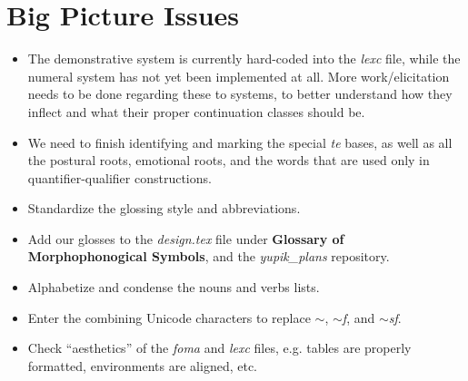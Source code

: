 \documentclass{article}
\begin{document}

\section{Big Picture Issues}

\begin{itemize}
\renewcommand\labelitemi{$\cdot$}

\item The demonstrative system is currently hard-coded into the \textit{lexc} file, while the numeral system has not yet been implemented at all.
%
More work/elicitation needs to be done regarding these to systems, to better understand how they inflect and what their proper continuation classes should be.

\item We need to finish identifying and marking the special \textit{te} bases, as well as all the postural roots, emotional roots, and the words that are used only in quantifier-qualifier constructions.

\item Standardize the glossing style and abbreviations.

\item Add our glosses to the \textit{design.tex} file under \textbf{Glossary of Morphophonogical Symbols}, and the \textit{yupik\_plans} repository.

\item Alphabetize and condense the nouns and verbs lists.

\item Enter the combining Unicode characters to replace \textit{$\sim$}, \textit{$\sim$f}, and \textit{$\sim$sf}.

\item Check ``aesthetics'' of the \textit{foma} and \textit{lexc} files, e.g. tables are properly formatted, environments are aligned, etc.

\end{itemize}
\end{document}
